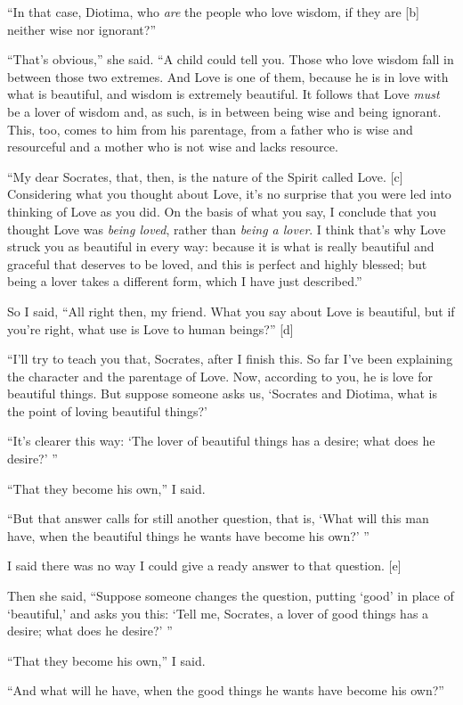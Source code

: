 “In that case, Diotima, who {\em are} the people who love wisdom, if
they are {[}b{]} neither wise nor ignorant?”

“That's obvious,” she said. “A child could tell you. Those who love
wisdom fall in between those two extremes. And Love is one of them,
because he is in love with what is beautiful, and wisdom is extremely
beautiful. It follows that Love {\em must} be a lover of wisdom and, as
such, is in between being wise and being ignorant. This, too, comes to
him from his parentage, from a father who is wise and resourceful and a
mother who is not wise and lacks resource.

“My dear Socrates, that, then, is the nature of the Spirit called Love.
{[}c{]} Considering what you thought about Love, it's no surprise that
you were led into thinking of Love as you did. On the basis of what you
say, I conclude that you thought Love was {\em being loved}, rather than
{\em being a lover}. I think that's why Love struck you as beautiful in
every way: because it is what is really beautiful and graceful that
deserves to be loved, and this is perfect and highly blessed; but being
a lover takes a different form, which I have just described.”

So I said, “All right then, my friend. What you say about Love is
beautiful, but if you're right, what use is Love to human beings?”
{[}d{]}

“I'll try to teach you that, Socrates, after I finish this. So far I've
been explaining the character and the parentage of Love. Now, according
to you, he is love for beautiful things. But suppose someone asks us,
‘Socrates and Diotima, what is the point of loving beautiful things?'

“It's clearer this way: ‘The lover of beautiful things has a desire;
what does he desire?' ”

“That they become his own,” I said.

“But that answer calls for still another question, that is, ‘What will
this man have, when the beautiful things he wants have become his own?'
”

I said there was no way I could give a ready answer to that question.
{[}e{]}

Then she said, “Suppose someone changes the question, putting ‘good' in
place of ‘beautiful,' and asks you this: ‘Tell me, Socrates, a lover of
good things has a desire; what does he desire?' ”

“That they become his own,” I said.

“And what will he have, when the good things he wants have become his
own?”

